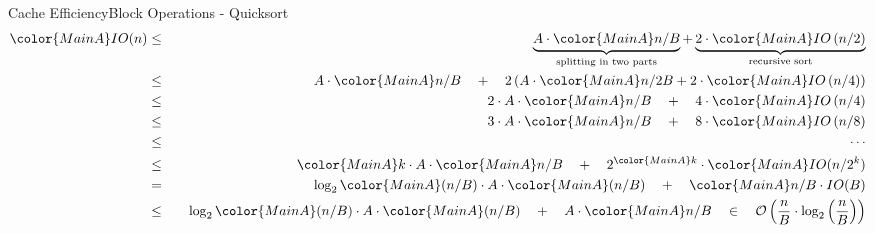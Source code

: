 
\begin{frame}{Cache Efficiency}{Block Operations - Quicksort}
  \begin{eqnarray*}
    {\color{MainA}IO(n)} &\leq\hspace{1em}&
      \underbrace{
        A \cdot {\color{MainA}n/B}
      }_{\text{splitting in two parts}}
      +
      \underbrace{
        2 \cdot {\color{MainA}IO\left(n/2 \right)}
      }_{\text{recursive sort}}\\
    {} &\leq&
      A \cdot {\color{MainA} n/B} \hspace{1em}+ \hspace{1em}2 \left(
        A \cdot {\color{MainA} n/2B}
        + 2 \cdot {\color{MainA}IO\left(n/4\right)}
      \right)\\
    {} &\leq&
      2 \cdot A \cdot {\color{MainA}n/B}
      \hspace{1em}+ \hspace{1em}4 \cdot {\color{MainA}IO\left(n/4\right)}\\
    {} &\leq&
      3 \cdot A \cdot {\color{MainA}n/B}
      \hspace{1em}+ \hspace{1em}8 \cdot {\color{MainA}IO\left(n/8\right)}\\
    {} &\leq&\hspace{1.5em}\cdots\\
    {} &\leq&
      {\color{MainA}k} \cdot A \cdot {\color{MainA}n/B}
      \hspace{1em}+\hspace{1em} 2^{\color{MainA}k}
      \cdot {\color{MainA}IO(n / 2^k)}\\
    {} &=&
      \log_2 {\color{MainA} (n / B)} \cdot A \cdot {\color{MainA}(n / B)}
      \hspace{1em}+\hspace{1em} {\color{MainA} n /B \cdot IO(B)}\\
    {} &\leq&
      \log_2 {\color{MainA} (n /B)} \cdot A \cdot {\color{MainA}(n / B)}
      \hspace{1em}+\hspace{1em} A \cdot {\color{MainA} n/B}
      \hspace{1em} \in \hspace{1em} \mathcal{O}\left(
        \frac{n}{B} \cdot \log_2 \left(\frac{n}{B}\right)
      \right)
  \end{eqnarray*}
\end{frame}
